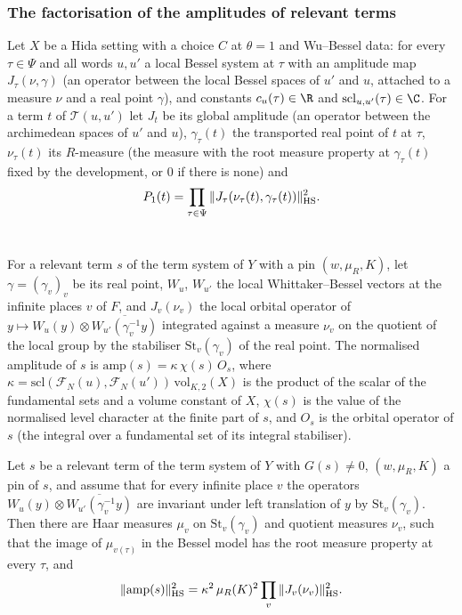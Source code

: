 \subsubsection{The factorisation of the amplitudes of relevant terms}

\begin{definition}\label{pf:sh-flag:defp1}
Let $X$ be a Hida setting with a choice $C$ at $\theta=1$ and Wu--Bessel data: for every $\tau\in\Psi$ and all words $u,u'$ a
local Bessel system at $\tau$ with an amplitude map $J_\tau(\nu,\gamma)$ (an operator between the local Bessel spaces of $u'$
and $u$, attached to a measure $\nu$ and a real point $\gamma$), and constants $c_u(\tau)\in\R$ and $\mathrm{scl}_{u,u'}(\tau)\in\C$.
For a term $t$ of $\mathcal T(u,u')$ let $J_t$ be its global amplitude (an operator between the archimedean spaces of $u'$
and $u$), $\gamma_\tau(t)$ the transported real point of $t$ at $\tau$, $\nu_\tau(t)$ its $R$-measure (the measure with the
root measure property at $\gamma_\tau(t)$ fixed by the development, or $0$ if there is none) and
\[
P_1(t)=\prod_{\tau\in\Psi}\|J_\tau(\nu_\tau(t),\gamma_\tau(t))\|_{\mathrm{HS}}^2 .
\]
\ 
\end{definition}

For a relevant term $s$ of the term system of $Y$ with a pin $(w,\mu_R,K)$, let $\gamma=(\gamma_v)_v$ be its real point, $W_u$, $W_{u'}$ the
local Whittaker--Bessel vectors at the infinite places $v$ of $F$, and $J_v(\nu_v)$ the local orbital operator of
$y\mapsto W_u(y)\otimes\overline{W_{u'}(\gamma_v^{-1}y)}$ integrated against a measure $\nu_v$ on the quotient of the local group by the
stabiliser $\mathrm{St}_v(\gamma_v)$ of the real point. The normalised amplitude of $s$ is
$\mathrm{amp}(s)=\kappa\,\chi(s)\,O_s$, where $\kappa=\mathrm{scl}(\mathcal F_N(u),\mathcal F_N(u'))\,\mathrm{vol}_{K,2}(X)$ is the product of the scalar
of the fundamental sets and a volume constant of $X$, $\chi(s)$ is the value of the normalised level character at the finite
part of $s$, and $O_s$ is the orbital operator of $s$ (the integral over a fundamental set of its integral stabiliser).

\begin{lemma}\label{pf:sh-flag:amplift}
Let $s$ be a relevant term of the term system of $Y$ with $G(s)\ne0$, $(w,\mu_R,K)$ a pin of $s$, and assume that for every infinite
place $v$ the operators $W_u(y)\otimes\overline{W_{u'}(\gamma_v^{-1}y)}$ are invariant under left translation of $y$ by
$\mathrm{St}_v(\gamma_v)$. Then there are Haar measures $\mu_v$ on $\mathrm{St}_v(\gamma_v)$ and quotient measures $\nu_v$, such that the image
of $\mu_{v(\tau)}$ in the Bessel model has the root measure property at every $\tau$, and
\begin{equation}\label{pf:sh-flag:eq:amplift}
\|\mathrm{amp}(s)\|_{\mathrm{HS}}^2=\kappa^2\,\mu_R(K)^2\prod_v\|J_v(\nu_v)\|_{\mathrm{HS}}^2 .
\end{equation}
\end{lemma}

